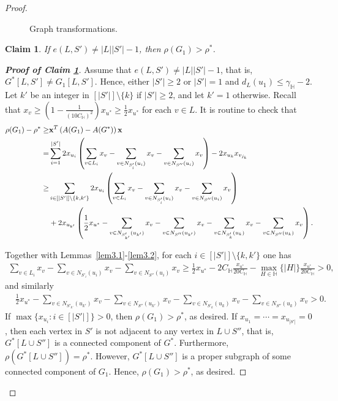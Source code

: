 \documentclass[11pt, a4paper]{article}
\newtheorem{claim}[theorem]{Claim}
\theoremstyle{definition}
\newcommand{\<}{\subseteq}
\begin{document}
\begin{proof}
\begin{figure}[ht!]
\begin{tikzpicture}[
    set/.style={ellipse, draw, minimum width=1.5cm, minimum height=1cm, opacity=0.7},
    node distance=1cm,
    point/.style={circle, fill=black, inner sep=1pt},
    label/.style={font=\small}
]
\end{tikzpicture}
    \caption{Graph transformations.}
    \label{fig:1}
\end{figure}
\begin{claim}\label{lem3.4}
If $e(L,S')\neq |L||S'|-1$, then $\rho(G_1)>\rho^*$.
\end{claim}
  \begin{proof}[\bf Proof of Claim \ref{lem3.4}]
Assume that $e(L,S')\neq |L||S'|-1$, that is,  $G^*[L,S']\neq G_1[L,S']$. Hence, either $|S'|\geq 2$ or $|S'|=1$ and $d_L(u_1)\leq\gamma_\mathbb{H}-2$.
Let $k'$ be an integer in $[|S'|]\setminus \{k\}$ if $|S'|\geq 2$, and let $k'=1$ otherwise. Recall that $x_v\geq (1-\frac{1}{(10C_\mathbb{H})^2})x_{u^*}\geq\frac{1}{2}x_{u^*}$ for each $v\in L$.  It is routine to check that \allowdisplaybreaks
    \begin{align*}\notag
        \rho(G_1)-\rho^* \geq& {\bf x}^T\left(A(G_1)-A(G^*)\right){\bf x}\\
        =&\sum_{i=1}^{|S'|}2x_{u_i}\left(\sum_{v\in L_i}x_v-\sum_{v\in N_{S'_{i}}(u_i)}x_v-\sum_{v\in N_{S''}(u_i)}x_v\right)-2x_{u_k}x_{v_{j_k}}\\
        \geq&\sum_{i\in [|S'|]\setminus \{k,k'\}}2x_{u_i}\left(\sum_{v\in L_i}x_v-\sum_{v\in N_{S'_{i}}(u_i)}x_v-\sum_{v\in N_{S''}(u_i)}x_v\right)\\
        &+2x_{u_{k'}}\left(\frac{1}{2}x_{u^*}-\sum_{v\in  N_{S'_{k'}}(u_{k'})}x_v-\sum_{v\in  N_{S''}(u_{k'})}x_v-\sum_{v\in N_{S'_{k}}(u_k)}x_v-\sum_{v\in N_{S''}(u_k)}x_v\right).
    \end{align*}

Together with Lemmas~\ref{lem3.1}-\ref{lem3.2}, for each $i\in [|S'|]\setminus \{k,k'\}$ one has 
\begin{align*}
    \sum_{v\in L_i}x_v-\sum_{v\in N_{S'_{i}}(u_i)}x_v-\sum_{v\in N_{S''}(u_i)}x_v
    \geq\frac{1}{2}x_{u^*}-2C_\mathbb{H}\frac{x_{u^*}}{20C_\mathbb{H}}-\max_{H\in \mathbb{H}}\{|H|\}\frac{x_{u^*}}{20C_\mathbb{H}}
    >0,
\end{align*}
and similarly 
\begin{align*}
   &\frac{1}{2}x_{u^*}-\sum_{v\in  N_{S'_{k'}}(u_{k'})}x_v-\sum_{v\in  N_{S''}(u_{k'})}x_v-\sum_{v\in N_{S'_{k}}(u_k)}x_v-\sum_{v\in N_{S''}(u_k)}x_v>0.%
\end{align*}
If $\max\{x_{u_i}:i\in [|S'|]\}>0$, then $\rho(G_1)>\rho^*$, as desired. If $x_{u_1}=\cdots=x_{u_{|S'|}}=0$, then each vertex in $S'$ is not adjacent to any vertex in $L\cup S''$, that is, $G^*[L\cup S'']$ is a connected component of $G^*$. Furthermore, $\rho(G^*[L\cup S''])=\rho^*$.  However, $G^*[L\cup S'']$ is a proper subgraph of some connected component of $G_1$. Hence, $\rho(G_1)>\rho^*$, as desired.
 \end{proof}


\end{proof}
\end{document}
